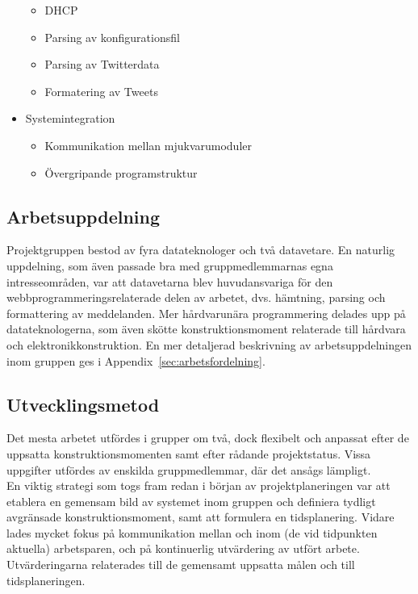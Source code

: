 \documentclass[a4paper,11pt]{article}
\begin{document}
\begin{itemize}
\begin{itemize}
        	\item DHCP
        	\item Parsing av konfigurationsfil
        	\item Parsing av Twitterdata
        	\item Formatering av Tweets
        	\end{itemize}
    	\item Systemintegration
    		\begin{itemize}
        	\item Kommunikation mellan mjukvarumoduler
        	\item Övergripande programstruktur
        	\end{itemize}
	\end{itemize}	

\subsection{Arbetsuppdelning}
Projektgruppen bestod av fyra datateknologer och två datavetare. En naturlig uppdelning, som även passade bra med gruppmedlemmarnas egna intresseområden, var att datavetarna blev huvudansvariga för den webbprogrammeringsrelaterade delen av arbetet, dvs. hämtning, parsing och formattering av meddelanden. Mer hårdvarunära programmering delades upp på datateknologerna, som även skötte konstruktionsmoment relaterade till hårdvara och elektronikkonstruktion. En mer detaljerad beskrivning av arbetsuppdelningen inom gruppen ges i Appendix~\ref{sec:arbetsfordelning}.

\subsection{Utvecklingsmetod}
Det mesta arbetet utfördes i grupper om två, dock flexibelt och anpassat efter de uppsatta konstruktionsmomenten samt efter rådande projektstatus. Vissa uppgifter utfördes av enskilda gruppmedlemmar, där det ansågs lämpligt.\\

En viktig strategi som togs fram redan i början av projektplaneringen var att etablera en gemensam bild av systemet inom gruppen och definiera tydligt avgränsade konstruktionsmoment, samt att formulera en tidsplanering. Vidare lades mycket fokus på kommunikation mellan och inom (de vid tidpunkten aktuella) arbetsparen, och på kontinuerlig utvärdering av utfört arbete. Utvärderingarna relaterades till de gemensamt uppsatta målen och till tidsplaneringen.\\
\end{document}
